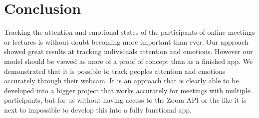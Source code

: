 \documentclass{article}
\begin{document}
\section{Conclusion}

Tracking the attention and emotional states of the participants of online meetings or lectures is without doubt becoming more important than ever. Our approach showed great results at tracking individuals attention and emotions. However our model should be viewed as more of a proof of concept than as a finished app. We demonstrated that it is possible to track peoples attention and emotions accurately through their webcam. It is an approach that is clearly able to be developed into a bigger project that works accurately for meetings with multiple participants, but for us without having access to the Zoom API or the like it is next to impossible to develop this into a fully functional app.



\end{document}
